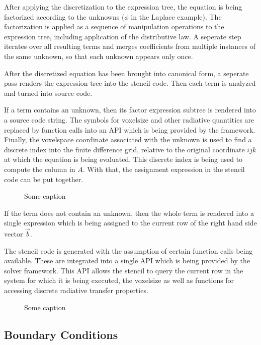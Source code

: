 After applying the discretization to the expression tree, the equation is being factorized according to the unknowns ($\phi$ in the Laplace example). The factorization is applied as a sequence of manipulation operations to the expression tree, including application of the distributive law. A seperate step iterates over all resulting terms and merges coefficients from multiple instances of the same unknown, so that each unknown appears only once. 

After the discretized equation has been brought into canonical form, a seperate pass renders the expression tree into the stencil code. Then each term is analyzed and turned into source code.

If a term contains an unknown, then its factor expression subtree is rendered into a source code string. The symbols for voxelsize and other radiative quantities are replaced by function calls into an API which is being provided by the framework. Finally, the voxelspace coordinate associated with the unknown is used to find a discrete index into the finite difference grid, relative to the original coordinate $ijk$ at which the equation is being evaluated. This discrete index is being used to compute the column in $A$. With that, the assignment expression in the stencil code can be put together.
\begin{figure}[h]
\centering
{}
\caption{Some caption}
\label{fig:pn_discretization_codegen}
\end{figure}
If the term does not contain an unknown, then the whole term is rendered into a single expression which is being assigned to the current row of the right hand side vector $\vec{b}$.

The stencil code is generated with the assumption of certain function calls being available. These are integrated into a single API which is being provided by the solver framework. This API allows the stencil to query the current row in the system for which it is being executed, the voxelsize as well as functions for accessing discrete radiative transfer properties.
\begin{figure}[h]
\centering
{}
\caption{Some caption}
\label{fig:pn_discretization_codegen_stencilAPI}
\end{figure}


\subsection{Boundary Conditions}
\label{sec:pn_bc}

